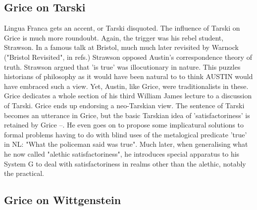 \documentclass[10pt,titlepage]{book}
\begin{document}
{\subsection{Grice on Tarski}

Lingua Franca gets an accent, or Tarski disquoted. The 
influence of  Tarski on Grice is much more roundoubt. Again, the trigger was 
his rebel  student, Strawson. In a famous talk at Bristol, much much later 
revisited  by Warnock ("Bristol Revisited", in refs.) Strawson opposed 
Austin's  correspondence theory of truth. Strawson argued that 'is true' was  
illocutionary in nature. This puzzles historians of philosophy as it would have  
been natural to to think AUSTIN would have embraced such a view. Yet,  
Austin, like Grice, were traditionalists in these. Grice dedicates a whole  
section of his third William James lecture to a discussion of Tarski. Grice ends  
up endorsing a neo-Tarskian view. The sentence of Tarski becomes an 
utterance in  Grice, but the basic Tarskian idea of 'satisfactoriness' is retained 
by Grice  --. He even goes on to propose some implicatural solutions to 
formal problems  having to do with blind uses of the metalogical predicate 
'true' in NL:  "What the policeman said was true". Much later, when generalising 
what he  now called "alethic satisfactoriness", he introduces special 
apparatus to his  System G to deal with satisfactoriness in realms other than the 
alethic,  notably the practical.  

\subsection{Grice on Wittgenstein}

}
\end{document}
